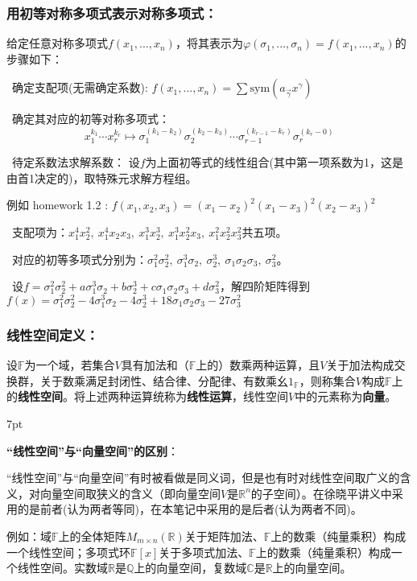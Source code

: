 \documentclass[zihao=-4,UTF8]{report}
\theoremstyle{mystyle} %
\newenvironment{graybox}{%
\def\FrameCommand{%
\hspace{1pt}%
{\color{gray}\small \vrule width 2pt}%
{\color{graybox_color}\vrule width 4pt}%
\colorbox{graybox_color}%
}%
\MakeFramed{\advance\hsize-\width\FrameRestore}%
\noindent\hspace{-4.55pt}%
\begin{adjustwidth}{}{7pt}%
\vspace{2pt}\vspace{2pt}%
}
{%
\vspace{2pt}\end{adjustwidth}\endMakeFramed%
}
\begin{document}
\subsubsection{用初等对称多项式表示对称多项式：}
给定任意对称多项式$f(x_1,...,x_n)$，将其表示为$\varphi(\sigma_1,...,\sigma_n) = f(x_1,...,x_n)$的步骤如下：
\par
{}\ 确定支配项(无需确定系数): $f(x_1,...,x_n) = \sum \text{sym}(a_{\vec{\gamma}}x^{\gamma})$\par
{}\  确定其对应的初等对称多项式：
\begin{equation*}
    x_1^{k_1}\cdots x_r^{k_r} \longmapsto \sigma_1^{(k_1-k_2)}\sigma_2^{(k_2-k_3)} \cdots \sigma_{r-1}^{(k_{r-1}-k_r)}\sigma_{r}^{(k_{r}-0)}
\end{equation*}
 \par
{}\  待定系数法求解系数： 设$f$为上面初等式的线性组合(其中第一项系数为1，这是由首1决定的)，取特殊元求解方程组。  \par
{\par\color{gray}\small
例如 homework 1.2 :
$f(x_1,x_2,x_3) = (x_1 - x_2)^2(x_1-x_3)^2(x_2-x_3)^2$\par
{}\ 支配项为：$x_1^4x_2^2,\ x_1^4x_2x_3,\ x_1^3x_2^3,\ x_1^3x_2^2x_3,\ x_1^2x_2^2x_3^2$共五项。\par
{}\ 对应的初等多项式分别为：$\sigma_1^2\sigma_2^2,\ \sigma_1^3\sigma_2,\ \sigma_2^3,\ \sigma_1\sigma_2\sigma_3,\ \sigma_3^2$。\par
{}\ 设$f = \sigma_1^2\sigma_2^2+a\sigma_1^3\sigma_2+b\sigma_2^3+c\sigma_1\sigma_2\sigma_3+d\sigma_3^2$，解四阶矩阵得到$f(x) =  \sigma_1^2\sigma_2^2-4\sigma_1^3\sigma_2-4\sigma_2^3+18\sigma_1\sigma_2\sigma_3-27\sigma_3^2$
\par
\par}

 

\subsubsection{线性空间定义：}
设$\mathbb{F}$为一个域，若集合$V$具有加法和（$\mathbb{F}$上的）数乘两种运算，且$V$关于加法构成交换群，关于数乘满足封闭性、结合律、分配律、有数乘幺$1_{\mathbb{F}}$，则称集合$V$构成$\mathbb{F}$上的\textbf{线性空间}。将上述两种运算统称为\textbf{线性运算}，线性空间$V$中的元素称为\textbf{向量}。
\begin{graybox}
    \textbf{“线性空间”与“向量空间”的区别}：\par
    “线性空间”与“向量空间”有时被看做是同义词，但是也有时对线性空间取广义的含义，对向量空间取狭义的含义（即向量空间$V$是$\mathbb{R}^n$的子空间）。在徐晓平讲义中采用的是前者(认为两者等同)，在本笔记中采用的是后者(认为两者不同)。
\end{graybox}
{\color{gray}\small  例如：域$\mathbb{F}$上的全体矩阵$M_{m\times n}(\mathbb{R})$关于矩阵加法、$\mathbb{F}$上的数乘（纯量乘积）构成一个线性空间；多项式环$\mathbb{F}[x]$关于多项式加法、$\mathbb{F}$上的数乘（纯量乘积）构成一个线性空间。实数域$\mathbb{R}$是$\mathbb{Q}$上的向量空间，复数域$\mathbb{C}$是$\mathbb{R}$上的向量空间。
}
\end{document}
